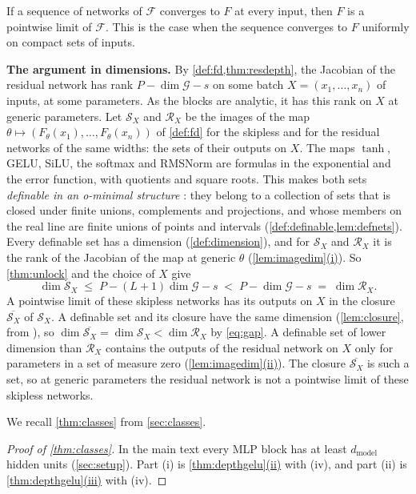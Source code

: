 \documentclass[10pt]{article}
\theoremstyle{definition}
\theoremstyle{remark}
\newcommand{\dm}{d_{\mathrm{model}}}
\newcommand{\G}{\mathcal{G}}
\newcommand{\para}[1]{\smallskip\noindent\textbf{#1}\hspace{0.5em}}
\DeclareRobustCommand{\cpref}[2]{\hyperref[#1:#2]{\cref*{#1}(#2)}}
\begin{document}
If a sequence of networks of $\mathcal F$ converges to $F$ at every input, then $F$ is a pointwise limit of $\mathcal F$. This is the case when the sequence converges to $F$ uniformly on compact sets of inputs.

\para{The argument in dimensions.} By \cref{def:fd,thm:resdepth}, the Jacobian of the residual network has rank $P - \dim\G - s$ on some batch $X = (x_1, \dots, x_n)$ of inputs, at some parameters. As the blocks are analytic, it has this rank on $X$ at generic parameters. Let $\mathcal S_X$ and $\mathcal R_X$ be the images of the map $\theta \mapsto (F_\theta(x_1), \dots, F_\theta(x_n))$ of \cref{def:fd} for the skipless and for the residual networks of the same widths: the sets of their outputs on $X$. The maps $\tanh$, GELU, SiLU, the softmax and RMSNorm are formulas in the exponential and the error function, with quotients and square roots. This makes both sets \emph{definable in an o-minimal structure} \citep{speissegger1997pfaffian}: they belong to a collection of sets that is closed under finite unions, complements and projections, and whose members on the real line are finite unions of points and intervals (\cref{def:definable,lem:defnets}). Every definable set has a dimension (\cref{def:dimension}), and for $\mathcal S_X$ and $\mathcal R_X$ it is the rank of the Jacobian of the map at generic $\theta$ (\cpref{lem:imagedim}{i}). So \cref{thm:unlock} and the choice of $X$ give
\begin{equation}\label{eq:gap}
\dim\mathcal S_X \;\le\; P - (L+1)\dim\G - s \;<\; P - \dim\G - s \;=\; \dim\mathcal R_X.
\end{equation}
A pointwise limit of these skipless networks has its outputs on $X$ in the closure $\overline{\mathcal S_X}$ of $\mathcal S_X$. A definable set and its closure have the same dimension (\cref{lem:closure}, from \citealp[Chapter~4, Theorem~(1.8)]{vandendries1998tame}), so $\dim\overline{\mathcal S_X} = \dim\mathcal S_X < \dim\mathcal R_X$ by \eqref{eq:gap}. A definable set of lower dimension than $\mathcal R_X$ contains the outputs of the residual network on $X$ only for parameters in a set of measure zero (\cpref{lem:imagedim}{ii}). The closure $\overline{\mathcal S_X}$ is such a set, so at generic parameters the residual network is not a pointwise limit of these skipless networks.

We recall \cref{thm:classes} from \cref{sec:classes}.
\thmClasses*

\begin{proof}[Proof of \cref{thm:classes}]
In the main text every MLP block has at least $\dm$ hidden units (\cref{sec:setup}). Part (i) is \cpref{thm:depthgelu}{ii} with (iv), and part (ii) is \cpref{thm:depthgelu}{iii} with (iv).
\end{proof}
\end{document}
